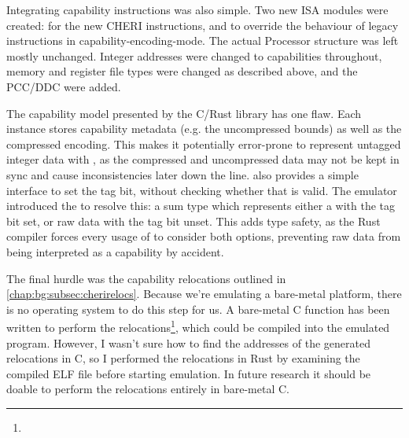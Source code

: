 
Integrating capability instructions was also simple.
Two new ISA modules were created:  for the new CHERI instructions, and  to override the behaviour of legacy instructions in capability-encoding-mode.
The actual Processor structure was left mostly unchanged.
Integer addresses were changed to capabilities throughout,
memory and register file types were changed as described above, and the PCC/DDC were added.

The capability model presented by the C/Rust library has one flaw.
Each  instance stores capability metadata (e.g. the uncompressed bounds) as well as the compressed encoding.
This makes it potentially error-prone to represent untagged integer data with , as the compressed and uncompressed data may not be kept in sync and cause inconsistencies later down the line.
 also provides a simple interface to set the tag bit, without checking whether that is valid.
The emulator introduced the  to resolve this: a sum type which represents either a  with the tag bit set, or raw data with the tag bit unset.
This adds type safety, as the Rust compiler forces every usage of  to consider both options, preventing raw data from being interpreted as a capability by accident.

The final hurdle was the capability relocations outlined in \cref{chap:bg:subsec:cherirelocs}.
Because we're emulating a bare-metal platform, there is no operating system to do this step for us.
A bare-metal C function has been written to perform the relocations\footnote{}, which could be compiled into the emulated program.
However, I wasn't sure how to find the addresses of the generated relocations in C, so I performed the relocations in Rust by examining the compiled ELF file before starting emulation.
In future research it should be doable to perform the relocations entirely in bare-metal C.

